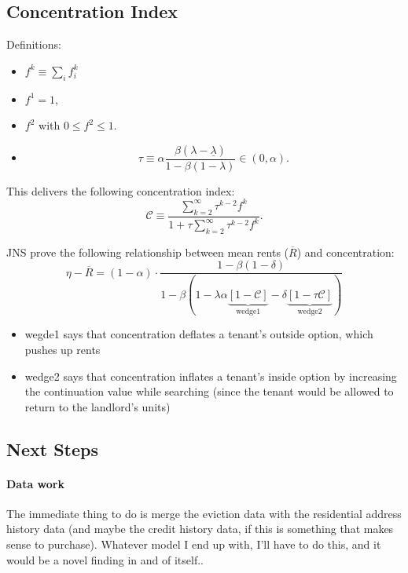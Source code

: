 \subsection{Concentration Index}
Definitions:
    \begin{itemize}
    \item $f^k \equiv \sum_i f_i^k$
    \item $f^1 = 1$, 
    \item $f^2$  with $0 \leq f^2 \leq 1$.
\item  \begin{equation}
            \tau \equiv \alpha \frac{\beta(\lambda - \underline{\lambda})}{1 - \beta(1 - \lambda)} \in (0, \alpha).
        \end{equation}
\end{itemize}
This delivers the following concentration index:
\begin{equation}
                \mathcal{C} \equiv \frac{\sum_{k=2}^{\infty} \tau^{k-2} f^k}{1 + \tau \sum_{k=2}^{\infty} \tau^{k-2} f^k}.
            \end{equation}

JNS prove the following relationship between mean rents ($\overline{R}$) and concentration:\\

\begin{equation}\label{eq:concentration-rents}
    \eta - \overline{R} = (1 - \alpha) \cdot \frac{1 - \beta(1 - \delta)}{1 - \beta \left( 1 - \lambda \alpha \underbrace{[1 - \mathcal{C}]}_{\text{wedge1}} - \delta \underbrace{[1 - \tau \mathcal{C}]}_{\text{wedge2}} \right)}
\end{equation}
\begin{itemize}
    \item wegde1 says that concentration deflates a tenant's outside option, which pushes up rents
    \item wedge2 says that concentration inflates a tenant's inside option by increasing the continuation value while searching (since the tenant would be allowed to return to the landlord's units)
\end{itemize}


\subsection{Next Steps}
\paragraph{Data work}
The immediate thing to do is merge the eviction data with the residential address history data (and maybe the credit history data, if this is something that makes sense to purchase). Whatever model I end up with, I'll have to do this, and it would be a novel finding in and of itself..

